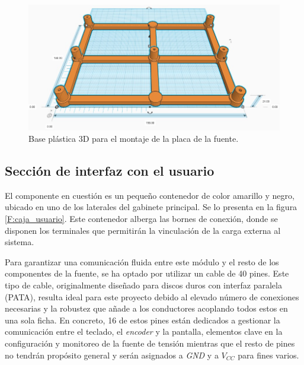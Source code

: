 \begin{figure}[H]
    \centering
    \includegraphics[scale=0.4]{./imagenes/3d_base.jpg}
    \caption{Base plástica 3D para el montaje de la placa de la fuente.}
    \label{F:base3d_fuente}
\end{figure}

\subsection{Sección de interfaz con el usuario}
El componente en cuestión es un pequeño contenedor de color amarillo y negro, ubicado en uno de los laterales del gabinete principal. Se lo presenta en la figura \ref{F:caja_usuario}. Este contenedor alberga las bornes de conexión, donde se disponen los terminales que permitirán la vinculación de la carga externa al sistema. \par
Para garantizar una comunicación fluida entre este módulo y el resto de los componentes de la fuente, se ha optado por utilizar un cable de 40 pines. Este tipo de cable, originalmente diseñado para discos duros con interfaz paralela (PATA), resulta ideal para este proyecto debido al elevado número de conexiones necesarias y la robustez que añade a los conductores acoplando todos estos en una sola ficha. En concreto, 16 de estos pines están dedicados a gestionar la comunicación entre el teclado, el \textit{encoder} y la pantalla, elementos clave en la configuración y monitoreo de la fuente de tensión mientras que el resto de pines no tendrán propósito general y serán asignados a \textit{GND} y a \textit{$V_{CC}$} para fines varios. \par

